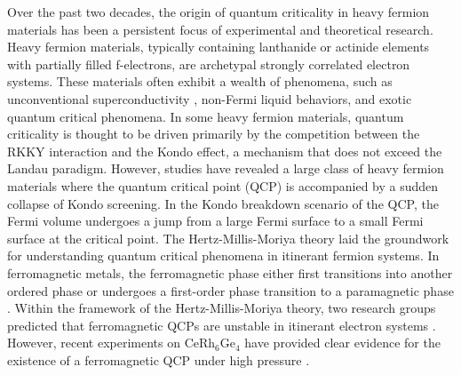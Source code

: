 \documentclass[preprint,12pt]{elsarticle}
\begin{document}
		Over the past two decades, the origin of quantum criticality in heavy fermion materials has been a persistent focus of experimental and theoretical research. Heavy fermion materials, typically containing lanthanide or actinide elements with partially filled f-electrons, are archetypal strongly correlated electron systems. These materials often exhibit a wealth of phenomena, such as unconventional superconductivity \cite{Ran2019_Science365-684,Jiao2020_Nature579-523--527,LiYu2021_ActaPhys.Sin.70-106-136,jiaolin:586},%
non-Fermi liquid behaviors\cite{legros:cea-02086419,PhysRevLett.85.626,Daou_2008,RevModPhys.73.797,PhysRevLett.72.3262,PhysRevLett.85.626}, %
and exotic quantum critical phenomena\cite{Si2010_Science329-1161--1166,Liu2023_PNAS120-e2300903120,Custers2003_Nature424-524--527}.%
In some heavy fermion materials, quantum criticality is thought to be driven primarily by the competition between the RKKY interaction and the Kondo effect, a mechanism that does not exceed the Landau paradigm. However, studies have revealed a large class of heavy fermion materials where the quantum critical point (QCP) is accompanied by a sudden collapse of Kondo screening. In the Kondo breakdown scenario of the QCP, the Fermi volume undergoes a jump from a large Fermi surface to a small Fermi surface at the critical point. The Hertz-Millis-Moriya theory \cite{Hertz1976_PRB14-1165--1184,Millis1993_PRB48-7183--7196,Moriya1985}%
laid the groundwork for understanding quantum critical phenomena in itinerant fermion systems. In ferromagnetic metals, the ferromagnetic phase either first transitions into another ordered phase or undergoes a first-order phase transition to a paramagnetic phase \cite{Brando2016_RMP88-025006,Belitz1999_PRL82-4707--4710,PhysRevB.91.035130,PhysRevLett.105.217201,PhysRevLett.93.256404}.%
Within the framework of the Hertz-Millis-Moriya theory, two research groups predicted that ferromagnetic QCPs are unstable in itinerant electron systems \cite{Belitz1999_PRL82-4707--4710,Chubukov2004_PRL92-147003}.%
However, recent experiments on CeRh$_6$Ge$_4$ have provided clear evidence for the existence of a ferromagnetic QCP under high pressure \cite{Shen_2020}.%
\end{document}
